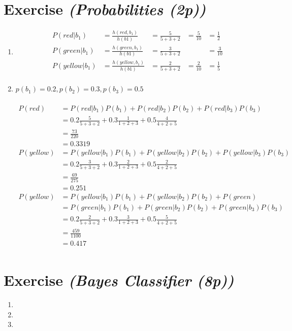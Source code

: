 \documentclass{article}
\author{Sandra Kohl, Jan Hendrik Kirchner, Max Bernhard Ilsen}
\begin{document}
\section{Exercise \textit{(Probabilities (2p))}}
\begin{enumerate}
    \item
        \begin{align*}
        P(red|b_1) &= \frac{h(red,b_1)}{h(b1)} &= \frac{5}{5+3+2} &= \frac{5}{10} &= \frac{1}{2}\\
            P(green|b_1) &= \frac{h(green,b_1)}{h(b1)} &= \frac{3}{5+3+2} &&= \frac{3}{10}\\
        P(yellow|b_1) &= \frac{h(yellow,b_1)}{h(b1)} &= \frac{2}{5+3+2} &= \frac{2}{10} &= \frac{1}{5}\\
        \end{align*}
    \item $p(b_1) = 0.2, p(b_2) = 0.3, p(b_3) = 0.5$\\
        \\
        \begin{align*}
        P(red) &= P(red|b_1)P(b_1) + P(red|b_2)P(b_2)+ P(red|b_3)P(b_3)\\
               &= 0.2\frac{5}{5+3+2} + 0.3\frac{1}{1+2+3} + 0.5\frac{4}{4+2+5}\\
            &= \frac{73}{220} \\&= 0.3319\\
        P(yellow) &= P(yellow|b_1)P(b_1) + P(yellow|b_2)P(b_2)+
            P(yellow|b_3)P(b_3)\\
            &= 0.2\frac{3}{5+3+2} + 0.3\frac{2}{1+2+3} + 0.5\frac{2}{4+2+5}\\
            &= \frac{69}{275} \\&= 0.251\\
        P(yellow) &= P(yellow|b_1)P(b_1) + P(yellow|b_2)P(b_2)+
        P(green)\\ &= P(green|b_1)P(b_1) + P(green|b_2)P(b_2)+
            P(green|b_3)P(b_3)\\
            &= 0.2\frac{2}{5+3+2} + 0.3\frac{3}{1+2+3} + 0.5\frac{5}{4+2+5}\\
            &= \frac{459}{1100}\\ &= 0.417\\
        \end{align*}
\end{enumerate}

\section{Exercise \textit{(Bayes Classifier (8p))}}
\begin{enumerate}
    \item
    \item
    \item
\end{enumerate}
\end{document}

